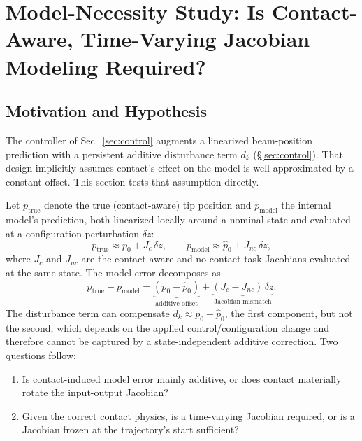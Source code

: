 \documentclass[journal]{IEEEtran}
\begin{document}

\section{Model-Necessity Study: Is Contact-Aware, Time-Varying Jacobian Modeling Required?}
\label{sec:model-necessity}

\subsection{Motivation and Hypothesis}
\label{sec:mn-motivation}

The controller of Sec.~\ref{sec:control} augments a linearized
beam-position prediction with a persistent additive disturbance term
$d_k$ (\S\ref{sec:control}). That design implicitly assumes contact's
effect on the model is well approximated by a constant offset. This
section tests that assumption directly.

Let $p_{\mathrm{true}}$ denote the true (contact-aware) tip position and
$p_{\mathrm{model}}$ the internal model's prediction, both linearized
locally around a nominal state and evaluated at a configuration
perturbation $\delta z$:
\begin{equation}
p_{\mathrm{true}} \approx p_0 + J_c\,\delta z,
\qquad
p_{\mathrm{model}} \approx \hat p_0 + J_{nc}\,\delta z,
\end{equation}
where $J_c$ and $J_{nc}$ are the contact-aware and no-contact task
Jacobians evaluated at the same state. The model error decomposes as
\begin{equation}
p_{\mathrm{true}} - p_{\mathrm{model}}
= \underbrace{(p_0 - \hat p_0)}_{\text{additive offset}}
+ \underbrace{(J_c - J_{nc})\,\delta z}_{\text{Jacobian mismatch}}.
\end{equation}
The disturbance term can compensate $d_k \approx p_0 - \hat p_0$, the
first component, but not the second, which depends on the applied
control/configuration change and therefore cannot be captured by a
state-independent additive correction. Two questions follow:
\begin{enumerate}
\item[Q1.] Is contact-induced model error mainly additive, or does
  contact materially rotate the input-output Jacobian?
\item[Q2.] Given the correct contact physics, is a time-varying
  Jacobian required, or is a Jacobian frozen at the trajectory's start
  sufficient?
\end{enumerate}
\end{document}
